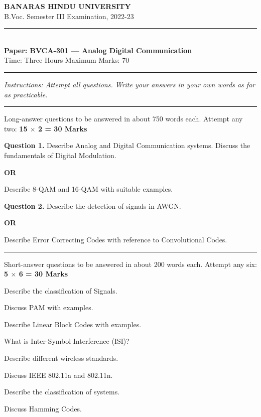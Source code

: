 \documentclass[11pt,a4paper]{article}
\begin{document}
\begin{center}
  {\large\bfseries BANARAS HINDU UNIVERSITY}\\[2pt]
  {
\normalsize B.Voc. Semester III Examination, 2022-23}\\[6pt]
  \rule{0.8\linewidth}{0.5pt}\\[6pt]
  {\large\bfseries Paper: BVCA-301 --- Analog Digital Communication}\\[4pt]
  {
\normalsize Time: Three Hours \hfill Maximum Marks: 70}
\end{center}

\rule{\linewidth}{0.4pt}

\smallskip



\noindent   \textit{Instructions: Attempt all questions. Write your answers in your own words as far as practicable.}

\bigskip

\bigskip


\rule{\linewidth}{0.4pt}\smallskip

Long-answer questions to be answered in about 750 words each. Attempt any two: \hfill   \textbf{15 $ \times$ 2 = 30 Marks}

\medskip



\noindent   \textbf{Question 1.} Describe Analog and Digital Communication systems. Discuss the fundamentals of Digital Modulation.
\centerline{   \textbf{OR}}
Describe 8-QAM and 16-QAM with suitable examples.

\medskip



\noindent   \textbf{Question 2.} Describe the detection of signals in AWGN.
\centerline{   \textbf{OR}}
Describe Error Correcting Codes with reference to Convolutional Codes.

\bigskip


\rule{\linewidth}{0.4pt}\smallskip

Short-answer questions to be answered in about 200 words each. Attempt any six: \hfill   \textbf{5 $ \times$ 6 = 30 Marks}

\begin{parts}
  \item Describe the classification of Signals.
  \item Discuss PAM with examples.
  \item Describe Linear Block Codes with examples.
  \item What is Inter-Symbol Interference (ISI)?
  \item Describe different wireless standards.
  \item Discuss IEEE 802.11a and 802.11n.
  \item Describe the classification of systems.
  \item Discuss Hamming Codes.
\end{parts}
\end{document}
